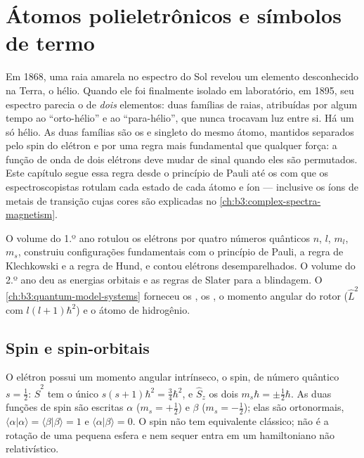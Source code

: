 \chapter{Átomos polieletrônicos e símbolos de termo}\label{ch:b3:many-electron-atoms}

Em 1868, uma raia amarela no espectro do Sol revelou um elemento
desconhecido na Terra, o hélio. Quando ele foi finalmente isolado em
laboratório, em 1895, seu espectro parecia o de \emph{dois} elementos: duas
famílias de raias, atribuídas por algum tempo ao ``orto-hélio'' e ao
``para-hélio'', que nunca trocavam luz entre si. Há um só hélio. As duas
famílias são os  e singleto do mesmo átomo, mantidos
separados pelo spin do elétron e por uma regra mais fundamental que
qualquer força: a função de onda de dois elétrons deve mudar de sinal quando
eles são permutados. Este capítulo segue essa regra desde o princípio de
Pauli até os  com que os espectroscopistas rotulam cada
estado de cada átomo e íon --- inclusive os íons de metais de transição
cujas cores são explicadas no \cref{ch:b3:complex-spectra-magnetism}.

\begin{recall}
O volume do 1.º ano rotulou os elétrons por quatro números quânticos $n$, $l$,
$m_l$, $m_s$, construiu configurações fundamentais com o princípio de Pauli,
a regra de Klechkowski e a regra de Hund, e contou elétrons desemparelhados.
O volume do 2.º ano deu as energias orbitais e as regras de Slater para a
blindagem. O \cref{ch:b3:quantum-model-systems} forneceu os , os
, o momento angular do rotor ($\hat L^2$ com 
$l(l+1)\hbar^2$) e o átomo de hidrogênio.
\end{recall}

\section{Spin e spin-orbitais}

O elétron possui um momento angular intrínseco, o spin, de número quântico
$s = \frac12$: $\hat S^2$ tem o único  $s(s+1)\hbar^2 =
\frac34\hbar^2$, e $\hat S_z$ os dois  $m_s\hbar = \pm\frac12\hbar$.
As duas funções de spin são escritas $\alpha$ ($m_s = +\frac12$) e $\beta$
($m_s = -\frac12$); elas são ortonormais, $\langle\alpha|\alpha\rangle =
\langle\beta|\beta\rangle = 1$ e $\langle\alpha|\beta\rangle = 0$. O spin não tem
equivalente clássico; não é a rotação de uma pequena esfera e nem sequer
entra em um hamiltoniano não relativístico.

